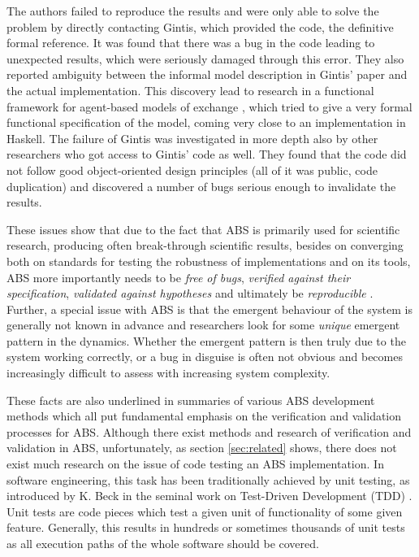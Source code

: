 The authors \cite{ionescu_dependently-typed_2012} failed to reproduce the results and were only able to solve the problem by directly contacting Gintis, which provided the code, the definitive formal reference. It was found that there was a bug in the code leading to unexpected results, which were seriously damaged through this error. They also reported ambiguity between the informal model description in Gintis' paper and the actual implementation. This discovery lead to research in a functional framework for agent-based models of exchange \cite{botta_functional_2011}, which tried to give a very formal functional specification of the model, coming very close to an implementation in Haskell. The failure of Gintis was investigated in more depth also by other researchers \cite{evensen_extensible_2010} who got access to Gintis' code as well. They found that the code did not follow good object-oriented design principles (all of it was public, code duplication) and discovered a number of bugs serious enough to invalidate the results.

These issues show that due to the fact that ABS is primarily used for scientific research, producing often break-through scientific results, besides on converging both on standards for testing the robustness of implementations and on its tools, ABS more importantly needs to be \textit{free of bugs}, \textit{verified against their specification}, \textit{validated against hypotheses} and ultimately be \textit{reproducible} \cite{axelrod_chapter_2006}. Further, a special issue with ABS is that the emergent behaviour of the system is generally not known in advance and researchers look for some \textit{unique} emergent pattern in the dynamics. Whether the emergent pattern is then truly due to the system working correctly, or a bug in disguise is often not obvious and becomes increasingly difficult to assess with increasing system complexity. 

These facts are also underlined in summaries of various ABS development methods \cite{hammer_tongs_north_2018} which all put fundamental emphasis on the verification and validation processes for ABS. Although there exist methods and research of verification and validation in ABS, unfortunately, as section \ref{sec:related} shows, there does not exist much research on the issue of code testing an ABS implementation. In software engineering, this task has been traditionally achieved by unit testing, as introduced by K. Beck in the seminal work on Test-Driven Development (TDD) \cite{beck_test_2002}. Unit tests are code pieces which test a given unit of functionality of some given feature. Generally, this results in hundreds or sometimes thousands of unit tests as all execution paths of the whole software should be covered.

